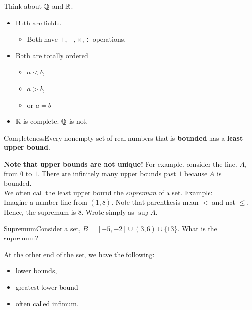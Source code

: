 Think about $\mathbb{Q}$ and $\mathbb{R}$.
    \begin{itemize}
        \item Both are fields.
        \begin{itemize}
            \item Both have $+,-,\times,\div$ operations.
        \end{itemize}
        \item Both are totally ordered
        \begin{itemize}
            \item $a < b$,
            \item $a > b$, 
            \item or $a = b$
        \end{itemize}
        \item $\mathbb{R}$ is complete. $\mathbb{Q}$ is not.
    \end{itemize}
    
\begin{axiom}
    {Completeness}Every nonempty set of real numbers that is \textbf{\gls{bounded}} has a \textbf{\gls{least upper bound}}.
\end{axiom}

\textbf{Note that \glspl{upper bound} are not unique!} For example, consider the line, $A$, from $0$ to $1$. There are infinitely many upper bounds past $1$ because $A$ is bounded. \\

We often call the least upper bound the \textit{supremum} of a set. Example: \\

Imagine a number line from $(1,8)$. Note that parenthesis mean $<$ and not $\leq$. Hence, the supremum is $8$. Wrote simply as $\sup A$. \\

\begin{example}
    {Supremum}Consider a set, $B = [-5,-2] \cup (3,6) \cup \{13\}$. What is the supremum?
\end{example}


At the other end of the set, we have the following:
\begin{itemize}
    \item lower bounds,
    \item greatest lower bound
    \item often called infimum.
\end{itemize}

